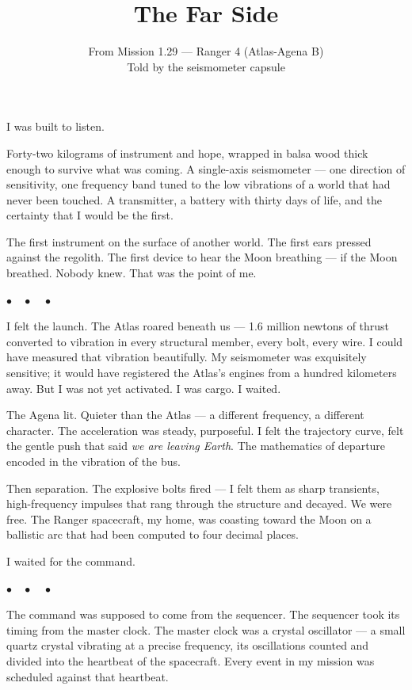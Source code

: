 \documentclass[12pt,letterpaper]{article}
\title{The Far Side}
\author{From Mission 1.29 --- Ranger 4 (Atlas-Agena B)\\
\small{Told by the seismometer capsule}}
\date{}
\begin{document}
\maketitle
\onehalfspacing

I was built to listen.

Forty-two kilograms of instrument and hope, wrapped in balsa wood thick enough to survive what was coming. A single-axis seismometer --- one direction of sensitivity, one frequency band tuned to the low vibrations of a world that had never been touched. A transmitter, a battery with thirty days of life, and the certainty that I would be the first.

The first instrument on the surface of another world. The first ears pressed against the regolith. The first device to hear the Moon breathing --- if the Moon breathed. Nobody knew. That was the point of me.

\begin{center}$\bullet\quad\bullet\quad\bullet$\end{center}

I felt the launch. The Atlas roared beneath us --- 1.6 million newtons of thrust converted to vibration in every structural member, every bolt, every wire. I could have measured that vibration beautifully. My seismometer was exquisitely sensitive; it would have registered the Atlas's engines from a hundred kilometers away. But I was not yet activated. I was cargo. I waited.

The Agena lit. Quieter than the Atlas --- a different frequency, a different character. The acceleration was steady, purposeful. I felt the trajectory curve, felt the gentle push that said \emph{we are leaving Earth}. The mathematics of departure encoded in the vibration of the bus.

Then separation. The explosive bolts fired --- I felt them as sharp transients, high-frequency impulses that rang through the structure and decayed. We were free. The Ranger spacecraft, my home, was coasting toward the Moon on a ballistic arc that had been computed to four decimal places.

I waited for the command.

\begin{center}$\bullet\quad\bullet\quad\bullet$\end{center}

The command was supposed to come from the sequencer. The sequencer took its timing from the master clock. The master clock was a crystal oscillator --- a small quartz crystal vibrating at a precise frequency, its oscillations counted and divided into the heartbeat of the spacecraft. Every event in my mission was scheduled against that heartbeat.
\end{document}
